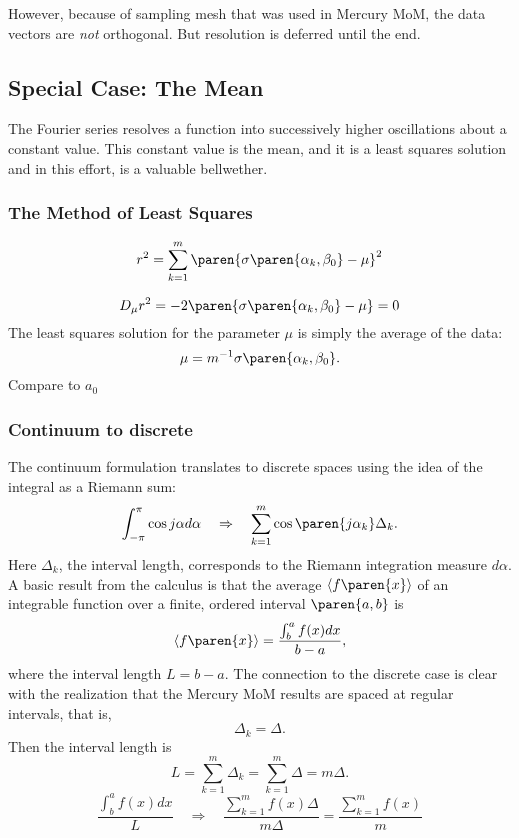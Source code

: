 However, because of sampling mesh that was used in Mercury MoM, the data vectors are {\it{not}} orthogonal. But resolution is deferred until the end.



\subsection{\label{sec:special-case}Special Case: The Mean}
The Fourier series resolves a function into successively higher oscillations about a constant value. This constant value is the mean, and it is a least squares solution and in this effort, is a valuable bellwether.

\subsubsection{The Method of Least Squares}
\begin{equation}
	r^{2} = \sum_{k=1}^{m} \paren{ \sigma\paren{\alpha_{k},\beta_{0}} - \mu }^{2}
\end{equation}

\begin{equation}
	D_{\mu} r^{2} = -2 \paren{ \sigma\paren{\alpha_{k},\beta_{0}} - \mu } = 0
\end{equation}
The least squares solution for the parameter $\mu$ is simply the average of the data:
\begin{equation}
	\mu = m^{-1}\sigma\paren{\alpha_{k},\beta_{0}}.
\end{equation}
Compare to $a_{0}$

\subsubsection{Continuum to discrete}
The continuum formulation translates to discrete spaces using the idea of the integral as a Riemann sum: 
\begin{equation}
	\int_{-\pi}^{\pi}{ \cos j\alpha d\alpha } \quad \Rightarrow \quad \sum_{k=1}^{m} \cos \paren{j\alpha_{k}} \Delta_{k}.
\end{equation}
Here $\Delta_{k}$, the interval length, corresponds to the Riemann integration measure $d\alpha$. A basic result from the calculus is that the average $\langle f\paren{x} \rangle$ of an integrable function over a finite, ordered interval $\paren{a,b}$ is
\begin{equation}
	\langle f\paren{x} \rangle = \frac{\int_{b}^{a} f(x) dx }{b-a},
\end{equation}
where the interval length $L=b-a$. The connection to the discrete case is clear with the realization that the Mercury MoM results are spaced at regular intervals, that is,
$$ \Delta_{k} = \Delta.$$ 
Then the interval length is
\begin{equation}
	L = \sum_{k=1}^{m} \Delta_{k} = \sum_{k=1}^{m}  \Delta = m \Delta.
\end{equation}
\begin{equation}
	\frac{\int_{b}^{a} f(x) dx }{L} \quad \Rightarrow \quad \frac{\sum_{k=1}^{m} f(x) \Delta}{m \Delta} =  \frac{\sum_{k=1}^{m} f(x)}{m}
\end{equation}


